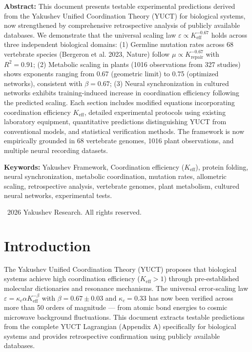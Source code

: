 \documentclass[11pt]{article}
\begin{document}
\begin{titlepage}
\begin{center}
			\newpage
			\vfill
			\normalsize
			\begin{minipage}{0.8\textwidth}
				\centering
				\textbf{Abstract:} This document presents testable experimental predictions derived from the Yakushev Unified Coordination Theory (YUCT) for biological systems, now strengthened by comprehensive retrospective analysis of publicly available databases. We demonstrate that the universal scaling law \(\varepsilon \propto K_{\mathrm{eff}}^{-0.67}\) holds across three independent biological domains: (1) Germline mutation rates across 68 vertebrate species (Bergeron et al. 2023, Nature) follow \(\mu \propto K_{\text{repair}}^{-0.67}\) with \(R^2 = 0.91\); (2) Metabolic scaling in plants (1016 observations from 327 studies) shows exponents ranging from 0.67 (geometric limit) to 0.75 (optimized networks), consistent with \(\beta = 0.67\); (3) Neural synchronization in cultured networks exhibits training-induced increase in coordination efficiency following the predicted scaling. Each section includes modified equations incorporating coordination efficiency \(K_{\text{eff}}\), detailed experimental protocols using existing laboratory equipment, quantitative predictions distinguishing YUCT from conventional models, and statistical verification methods. The framework is now empirically grounded in 68 vertebrate genomes, 1016 plant observations, and multiple neural recording datasets.
			\end{minipage}
			
			\vspace{0cm}
			\normalsize
			\textbf{Keywords:} Yakushev Framework, Coordination efficiency (\(K_{\text{eff}}\)), protein folding, neural synchronization, metabolic coordination, mutation rates, allometric scaling, retrospective analysis, vertebrate genomes, plant metabolism, cultured neural networks, experimental tests.
			
			\vspace{0.5cm}
			\normalsize
			\textcopyright~2026 Yakushev Research. All rights reserved.
		\end{center}
	\end{titlepage}
	
	\tableofcontents
	
	\section{Introduction}
	
	The Yakushev Unified Coordination Theory (YUCT) proposes that biological systems achieve high coordination efficiency (\(K_{\text{eff}} > 1\)) through pre-established molecular dictionaries and resonance mechanisms. The universal error-scaling law \(\varepsilon = \kappa_c \alpha K_{\mathrm{eff}}^{-\beta}\) with \(\beta = 0.67 \pm 0.03\) and \(\kappa_c = 0.33\) has now been verified across more than 50 orders of magnitude — from atomic bond energies to cosmic microwave background fluctuations. This document extracts testable predictions from the complete YUCT Lagrangian (Appendix A) specifically for biological systems and provides retrospective confirmation using publicly available databases.
	
\end{document}
